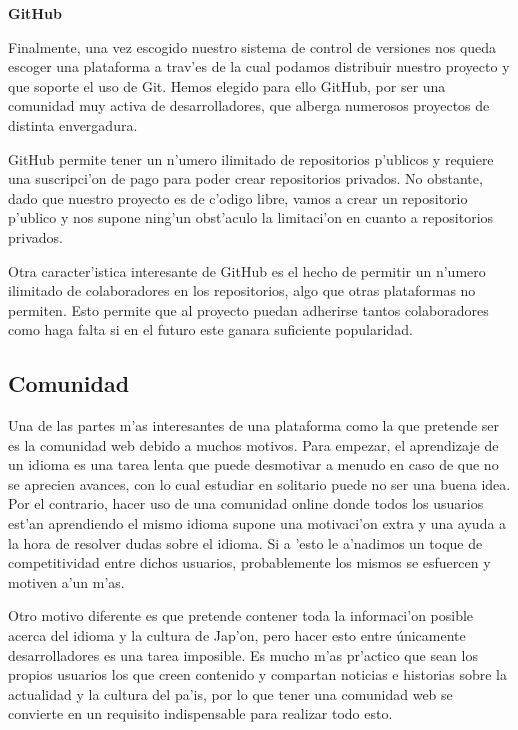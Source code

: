\textbf{GitHub}

Finalmente, una vez escogido nuestro sistema de control de versiones nos queda escoger una plataforma a trav'es de la
cual podamos distribuir nuestro proyecto y que soporte el uso de Git. Hemos elegido para ello GitHub, por ser una
comunidad muy activa de desarrolladores, que alberga numerosos proyectos de distinta envergadura.

GitHub permite tener un n'umero ilimitado de repositorios p'ublicos y requiere una suscripci'on de pago para poder
crear repositorios privados. No obstante, dado que nuestro proyecto es de c'odigo libre, vamos a crear un repositorio
p'ublico y nos supone ning'un obst'aculo la limitaci'on en cuanto a repositorios privados.

Otra caracter'istica interesante de GitHub es el hecho de permitir un n'umero ilimitado de colaboradores en los
repositorios, algo que otras plataformas no permiten. Esto permite que al proyecto puedan adherirse tantos
colaboradores como haga falta si en el futuro este ganara suficiente popularidad.


\subsection{Comunidad}
\label{sec:comunidad}
Una de las partes m'as interesantes de una plataforma como la que pretende ser \Nipponline{} es la comunidad web debido
a muchos motivos. Para empezar, el aprendizaje de un idioma es una tarea lenta que puede desmotivar a menudo en caso
de que no se aprecien avances, con lo cual estudiar en solitario puede no ser una buena idea. Por el contrario, hacer
uso de una comunidad online donde todos los usuarios est'an aprendiendo el mismo idioma supone una motivaci'on extra
y una ayuda a la hora de resolver dudas sobre el idioma. Si a 'esto le a'nadimos un toque de competitividad entre dichos
usuarios, probablemente los mismos se esfuercen y motiven a'un m'as.

Otro motivo diferente es que \Nipponline{} pretende contener toda la informaci'on posible acerca del idioma y la cultura
de Jap'on, pero hacer esto entre únicamente desarrolladores es una tarea imposible. Es mucho m'as pr'actico que sean
los propios usuarios los que creen contenido y compartan noticias e historias sobre la actualidad y la cultura del pa'is,
por lo que tener una comunidad web se convierte en un requisito indispensable para realizar todo esto.

